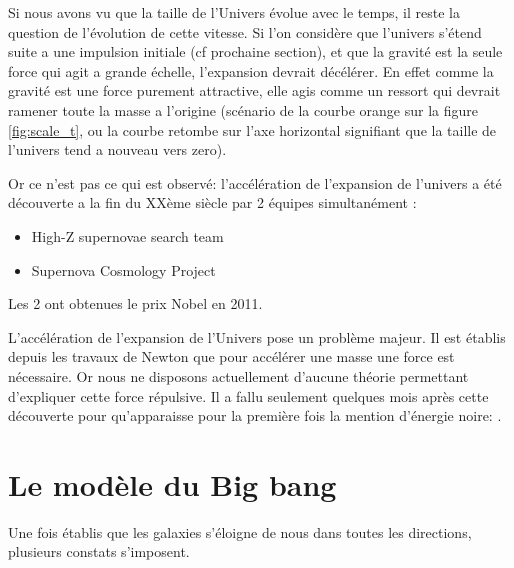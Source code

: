

Si nous avons vu que la taille de l'Univers évolue avec le temps, il reste la question de l’évolution de cette vitesse.
Si l'on considère que l'univers s’étend suite a une impulsion initiale (cf prochaine section), et que la gravité est la seule force qui agit a grande échelle, l'expansion devrait décélérer.
En effet comme la gravité est une force purement attractive, elle agis comme un ressort qui devrait ramener toute la masse a l'origine (scénario de la courbe orange sur la figure \ref{fig:scale_t}, ou la courbe retombe sur l'axe horizontal signifiant que la taille de l'univers tend a nouveau vers zero).

Or ce n'est pas ce qui est observé: l'accélération de l'expansion de l'univers a été découverte a la fin du XXème siècle par 2 équipes simultanément :
\begin{itemize}
\item  High-Z supernovae search team \citep{1998AJ....116.1009R}%
\item  Supernova Cosmology Project \citep{1999ApJ...517..565P}%
\end{itemize}
Les 2 ont obtenues le prix Nobel en 2011.

L'accélération de l'expansion de l'Univers pose un problème majeur.
Il est établis depuis les travaux de Newton que pour accélérer une masse une force est nécessaire.
Or nous ne disposons actuellement d'aucune théorie permettant d'expliquer cette force répulsive.
Il a fallu seulement quelques mois après cette découverte pour qu’apparaisse pour la première fois la mention d'énergie noire: \citep{1999PhRvD..60h1301H}.


%
%

\section{Le modèle du Big bang}




Une fois établis que les galaxies s'éloigne de nous dans toutes les directions, plusieurs constats s'imposent.

